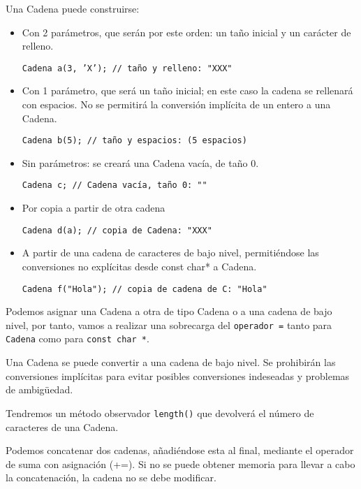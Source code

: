 Una Cadena puede construirse:
\begin{itemize}
    \item Con 2 parámetros, que serán por este orden: un taño inicial y un carácter de relleno.
        \begin{center}
            \texttt{Cadena a(3, 'X'); // taño y relleno: "XXX"}
        \end{center}
    \item Con 1 parámetro, que será un taño inicial; en este caso la cadena se rellenará con 
    espacios. No se permitirá la conversión implícita de un entero a una Cadena.
        \begin{center}
            \texttt{Cadena b(5); // taño y espacios: (5 espacios)}
        \end{center}
    \item Sin parámetros: se creará una Cadena vacía, de taño 0.
        \begin{center}
            \texttt{Cadena c; // Cadena vacía, taño 0: ""}
        \end{center}
    \item Por copia a partir de otra cadena
        \begin{center}
            \texttt{Cadena d(a); // copia de Cadena: "XXX"}
        \end{center}
    \item A partir de una cadena de caracteres de bajo nivel, 
    permitiéndose las conversiones no explícitas desde const char* a Cadena.
        \begin{center}
            \texttt{Cadena f("Hola"); // copia de cadena de C: "Hola"}
        \end{center}
\end{itemize}

Podemos asignar una Cadena a otra de tipo Cadena o a una cadena de bajo nivel, por tanto, 
vamos a realizar una sobrecarga del \texttt{operador =} tanto para \texttt{Cadena} como para \texttt{const char *}.

Una Cadena se puede convertir a una cadena de bajo nivel. Se prohibirán las conversiones
implícitas para evitar posibles conversiones indeseadas y problemas de ambigüedad.

Tendremos un método observador \texttt{length()} que devolverá el número de caracteres de una Cadena.

Podemos concatenar dos cadenas, añadiéndose esta al final, mediante el operador de suma con 
asignación (+=). Si no se puede obtener memoria para llevar a cabo la concatenación, 
la cadena no se debe modificar.

